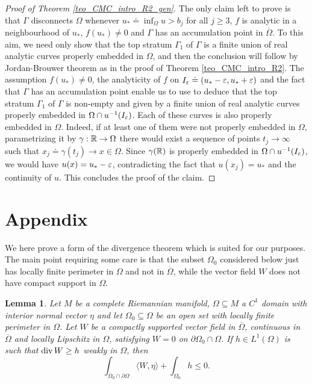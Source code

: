 \documentclass[10 pt,a4paper]{article}
\newtheorem{lemma}[definition]{Lemma}
\theoremstyle{definition}
\begin{document}
\begin{proof}[Proof of Theorem \ref{teo_CMC_intro_R2_gen}]
	The only claim left to prove is that $\Gamma$ disconnects $\Omega$ whenever $u_\ast \doteq \inf_\Omega u > b_j$ for all $j\geq 3$, $f$ is analytic in a neighbourhood of $u_\ast$, $f(u_\ast) \neq 0$ and $\Gamma$ has an accumulation point in $\overline{\Omega}$. To this aim, we need only show that the top stratum $\Gamma_1$ of $\Gamma$ is a finite union of real analytic curves properly embedded in $\Omega$, and then the conclusion will follow by Jordan-Brouwer theorem as in the proof of Theorem \ref{teo_CMC_intro_R2}. The assumption $f(u_\ast) \neq 0$, the analyticity of $f$ on $I_\varepsilon \doteq (u_\ast-\varepsilon, u_\ast+\varepsilon)$ and the fact that $\Gamma$ has an accumulation point enable us to use \cite[Corollary 3.4]{BCM} to deduce that the top stratum $\Gamma_1$ of $\Gamma$ is non-empty and given by a finite union of real analytic curves properly embedded in $\Omega \cap u^{-1}(I_\varepsilon)$. Each of these curves is also properly embedded in $\Omega$. Indeed, if at least one of them were not properly embedded in $\Omega$, parametrizing it by $\gamma : \mathbb R \to \Omega$ there would exist a sequence of points $t_j \to \infty$ such that $x_j \doteq \gamma(t_j) \to x \in \Omega$. Since $\gamma(\mathbb R)$ is properly embedded in $\Omega \cap u^{-1}(I_\varepsilon)$, we would have $u(x) = u_\ast-\varepsilon$, contradicting the fact that $u(x_j)= u_\ast$ and the continuity of $u$. This concludes the proof of the claim.
\end{proof}


%
%
%

\section*{Appendix}

We here prove a form of the divergence theorem which is suited for our purposes. The main point requiring some care is that the subset $\Omega_0$ considered below just has locally finite perimeter in $\Omega$ and not in $\overline\Omega$, while the vector field $W$ does not have compact support in $\Omega$. 


\begin{lemma} \label{lem_divergence}
	Let $M$ be a complete Riemannian manifold, $\Omega\subseteq M$ a $C^1$ domain with interior normal vector $\eta$ and let $\Omega_0\subseteq\Omega$ be an open set with locally finite perimeter in $\Omega$. Let $W$ be a compactly supported vector field in $\overline\Omega$, continuous in $\overline{\Omega}$ and locally Lipschitz in $\Omega$, satisfying $W=0$ on $\partial\Omega_0\cap\Omega$. If $h\in L^1(\Omega)$ is such that $\mathrm{div}\,W \geq h$ weakly in $\Omega$, then
	\begin{equation} \label{GGloc}
		\int_{\overline{\Omega}_0\cap\partial\Omega} \langle W,\eta\rangle + \int_{\Omega_0} h \leq 0 .
	\end{equation}
\end{lemma}
\end{document}
